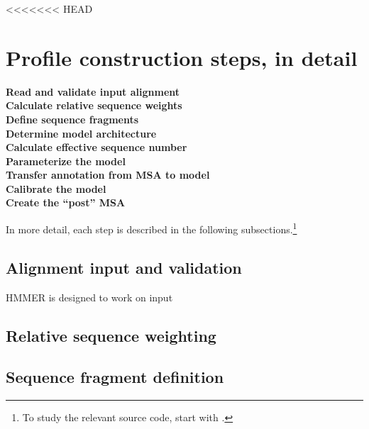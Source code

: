 <<<<<<< HEAD
\section{Profile construction steps, in detail}
\label{section:pipeline}
\setcounter{footnote}{0}

\begin{description}

\item [\textbf{Read and validate input alignment}]

\item [\textbf{Calculate relative sequence weights}]

\item [\textbf{Define sequence fragments}]

\item [\textbf{Determine model architecture}]

\item [\textbf{Calculate effective sequence number}]

\item [\textbf{Parameterize the model}]

\item [\textbf{Transfer annotation from MSA to model}]

\item [\textbf{Calibrate the model}]

\item [\textbf{Create the ``post'' MSA}]

\end{description}

In more detail, each step is described in the following
subsections.\footnote{To study the relevant source code, start with
  .}


\subsection{Alignment input and validation}

HMMER is designed to work on input 


\subsection{Relative sequence weighting}

\subsection{Sequence fragment definition}

